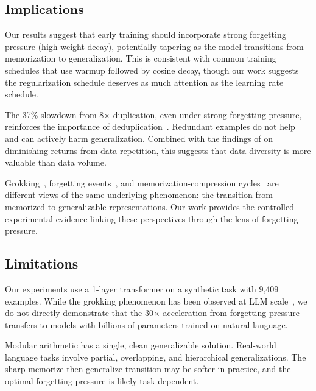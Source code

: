 \subsection{Implications}

 Our results suggest that early training should incorporate strong forgetting pressure (high weight decay), potentially tapering as the model transitions from memorization to generalization. This is consistent with common training schedules that use warmup followed by cosine decay, though our work suggests the regularization schedule deserves as much attention as the learning rate schedule.

 The 37\% slowdown from 8$\times$ duplication, even under strong forgetting pressure, reinforces the importance of deduplication~\cite{lee2022deduplicating, abbas2023semdedup}. Redundant examples do not help and can actively harm generalization. Combined with the findings of \citet{muennighoff2023scaling} on diminishing returns from data repetition, this suggests that data diversity is more valuable than data volume.

 Grokking~\cite{power2022grokking}, forgetting events~\cite{toneva2019empirical}, and memorization-compression cycles~\cite{yu2025memorization} are different views of the same underlying phenomenon: the transition from memorized to generalizable representations. Our work provides the controlled experimental evidence linking these perspectives through the lens of forgetting pressure.

\subsection{Limitations}

 Our experiments use a 1-layer transformer on a synthetic task with 9,409 examples. While the grokking phenomenon has been observed at LLM scale~\cite{li2025grokking, yu2025memorization}, we do not directly demonstrate that the 30$\times$ acceleration from forgetting pressure transfers to models with billions of parameters trained on natural language.

 Modular arithmetic has a single, clean generalizable solution. Real-world language tasks involve partial, overlapping, and hierarchical generalizations. The sharp memorize-then-generalize transition may be softer in practice, and the optimal forgetting pressure is likely task-dependent.

